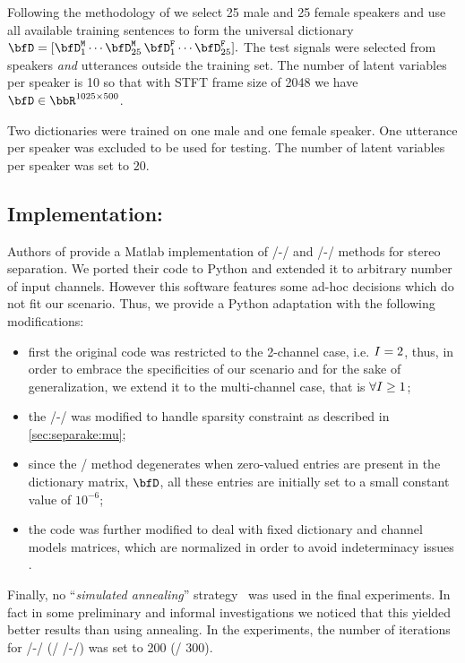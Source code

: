 Following the methodology of  we select 25 male and 25 female speakers
and use all available training sentences to form the universal dictionary
$
    \mD = [\mD_1^\mathtt{M}\cdots \mD_{25}^\mathtt{M}\,\mD_{1}^\mathtt{F}\cdots\mD_{25}^\mathtt{F}].
$
The test signals were selected from speakers \emph{and} utterances outside the training set.
The number of latent variables per speaker is 10 so that with STFT frame size of 2048 we have $\mD\in\R^{1025\times500}$.

Two dictionaries were trained on one male and one female speaker.
One utterance per speaker was excluded to be used for testing.
The number of latent variables per speaker was set to $20$.

\subsection{Implementation:}
Authors of  provide a Matlab implementation of \MU/-\NMF/ and \EM/-\NMF/ methods for stereo separation.
We ported their code to Python and extended it to arbitrary number of input channels.
However this software features some ad-hoc decisions which do not fit our scenario.
Thus, we provide a Python adaptation with the following modifications:
\begin{itemize}
    \item first the original code was restricted to the 2-channel case, i.e.  $I = 2$,
    thus, in order to embrace the specificities of our scenario and for the sake of generalization, we extend it to the multi-channel case, that is $\forall I \geq 1$;
    \item the \MU/-\NMF/ was modified to handle sparsity constraint as described in \ref{sec:separake:mu};
    \item since the \EM/ method degenerates when zero-valued entries are present in the dictionary matrix, $\mD$, all these entries are initially set to a small constant value of $10^{-6}$;
    \item the code was further modified to deal with fixed dictionary and channel models matrices, which are normalized in order to avoid indeterminacy issues .
\end{itemize}
Finally, no ``\textit{simulated annealing}'' strategy~ was used in the final experiments.
In fact in some preliminary and informal investigations we noticed that this yielded better results than using annealing.
In the experiments, the number of iterations for \MU/-\NMF/ (\resp/ \EM/-\NMF/) was set to 200 (\resp/ 300).

